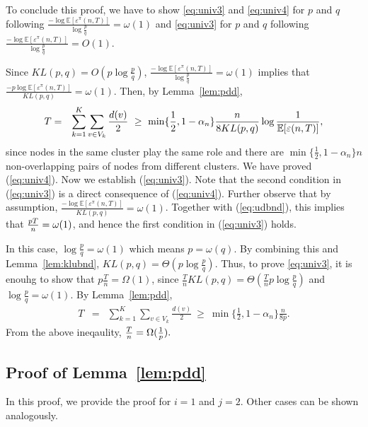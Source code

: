 To conclude this proof, we have to show \eqref{eq:univ3} and
\eqref{eq:univ4} for $p$ and $q$ following $\frac{-\log
  \mathbb{E}[\varepsilon^{\pi}(n,T)]}{\log\frac{p}{q}} = \omega(1)$
and \eqref{eq:univ3} for $p$ and $q$ following $\frac{-\log
  \mathbb{E}[\varepsilon^{\pi}(n,T)]}{\log\frac{p}{q}} = O(1)$.

\smallskip
{}
Since
 $KL(p,q)  = O( p\log \frac{p}{q} )$,
$\frac{-\log \mathbb{E}[\varepsilon^\pi(n,T)]}{ \log \frac{p}{q} } =
\omega(1)$ implies that $\frac{-p \log \mathbb{E}[\varepsilon^\pi(n,T)]}{
  KL(p,q) } = \omega(1)$. Then, by Lemma~\ref{lem:pdd},
\begin{eqnarray}
T &= &\sum_{k=1}^K\sum_{v\in V_k}
\frac{d(v)}{2} 
~\ge~ \min\{\frac{1}{2},1-\alpha_n \}\frac{n}{8 KL(p,q)} \log \frac{1}{ {\mathbb E} [\varepsilon (n,T) ]}, \label{eq:udbnd} \end{eqnarray}
since nodes in the same cluster play the same role and there are $\min\{\frac{1}{2},1-\alpha_n \}n$ non-overlapping pairs of nodes from different clusters.  
We have proved (\ref{eq:univ4}). Now we establish
(\ref{eq:univ3}). Note that the second condition in (\ref{eq:univ3})
is a direct consequence of (\ref{eq:univ4}). Further observe that by
assumption, $\frac{-\log
  \mathbb{E}[\varepsilon^{\pi}(n,T)]}{KL(p,q)} = \omega(1)$. Together with (\ref{eq:udbnd}), this implies that ${pT\over n}=\omega(1)$, and hence the first condition in (\ref{eq:univ3}) holds.  

\smallskip
{} In
this case, $\log\frac{p}{q} = \omega(1)$ which means
$p=\omega(q)$. By combining this and Lemma~\ref{lem:klubnd},
$KL(p,q)=\Theta (p\log\frac{p}{q})$. Thus, to prove \eqref{eq:univ3}, it
is enouhg to show that
$p\frac{T}{n} = \Omega(1)$, since $\frac{T}{n}KL(p,q) =
\Theta(\frac{T}{n}p\log\frac{p}{q})$ and $\log \frac{p}{q} = \omega(1)$.  By Lemma~\ref{lem:pdd},
\begin{eqnarray}
T &= &\sum_{k=1}^K\sum_{v\in V_k}
\frac{d(v)}{2} 
~\ge~ \min\{\frac{1}{2},1-\alpha_n \}\frac{n}{8 p}. \label{eq:udbnd2} \end{eqnarray}
From the above ineqaulity, ${T\over n} = \Omega( \frac{1}{p}).$

\subsection{Proof of Lemma~\ref{lem:pdd}}
In this proof, we provide the proof for $i=1$ and $j=2$. Other cases
can be shown analogously.

